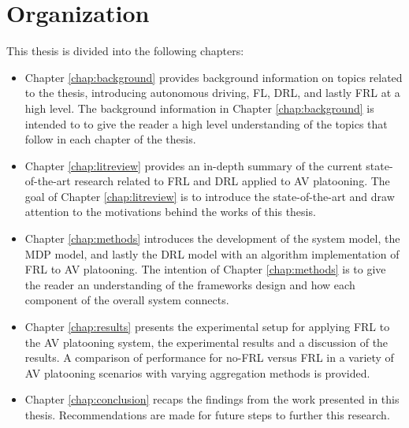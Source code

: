 \section{Organization}
This thesis is divided into the following chapters:

\begin{itemize}
    \item Chapter \ref{chap:background} provides background information on
    topics related to the thesis, introducing autonomous driving, FL, DRL,
    and lastly FRL at a high level. The background information in Chapter
    \ref{chap:background} is intended to to give the reader a high level
    understanding of the topics that follow in each
    chapter of the thesis.
    \vspace{12pt}
    \item Chapter \ref{chap:litreview} provides an in-depth summary of
    the current state-of-the-art research related to FRL and DRL applied
    to AV platooning. The goal of Chapter \ref{chap:litreview} is to
    introduce the state-of-the-art and draw attention to the motivations
    behind the works of this thesis.
    \vspace{12pt}
    \item Chapter \ref{chap:methods} introduces the development of the
    system model, the MDP model, and lastly the DRL model with an
    algorithm implementation of FRL to AV platooning.  The intention of
    Chapter \ref{chap:methods} is to give the reader an understanding of
    the frameworks design and how each component of the overall system
    connects.
    \vspace{12pt}
    \item Chapter \ref{chap:results} presents the experimental
    setup for applying FRL to the AV platooning system, the
    experimental results and a discussion of the results. A comparison of performance for
    no-FRL versus FRL in a variety of AV platooning scenarios with varying
    aggregation methods is provided.
    \vspace{12pt}
    \item Chapter \ref{chap:conclusion} recaps the findings
    from the work presented in this thesis. Recommendations
    are made for future steps to further this research.
\end{itemize}

